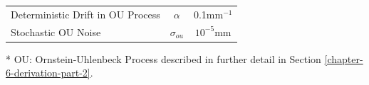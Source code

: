 \begin{table}[!htbp]
\begin{center}
\begin{threeparttable}
\begin{tabular}{lccc}
\multicolumn{2}{l}{Deterministic Drift in OU Process} 
& $\alpha$ & 0.1mm$^{-1}$ \\

\multicolumn{2}{l}{Stochastic OU Noise} 
& $\sigma_{ou}$ & $10^{-5}$mm \\

\bottomrule
\end{tabular}

\begin{tablenotes}\footnotesize
\item[*] OU: Ornstein-Uhlenbeck Process \cite{OU} described in further detail in Section \ref{chapter-6-derivation-part-2}.
\end{tablenotes}

\end{threeparttable}
\end{center}

\label{tab:kf-instance-variables-xy}
\end{table}






